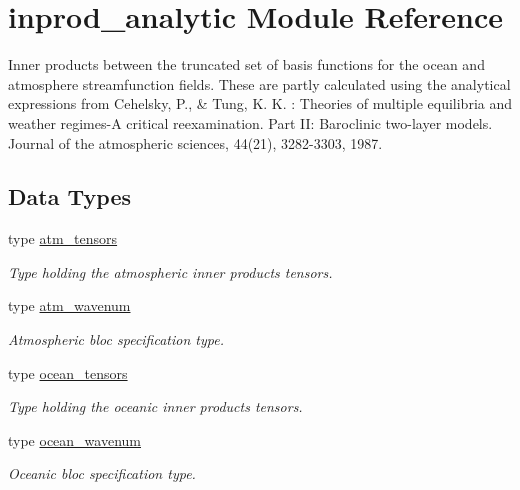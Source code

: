 \hypertarget{classinprod__analytic}{\section{inprod\-\_\-analytic Module Reference}
\label{classinprod__analytic}
}


Inner products between the truncated set of basis functions for the ocean and atmosphere streamfunction fields. These are partly calculated using the analytical expressions from Cehelsky, P., \& Tung, K. K. \-: Theories of multiple equilibria and weather regimes-\/\-A critical reexamination. Part I\-I\-: Baroclinic two-\/layer models. Journal of the atmospheric sciences, 44(21), 3282-\/3303, 1987.  


\subsection*{Data Types}
\begin{DoxyCompactItemize}
\item 
type \hyperlink{structinprod__analytic_1_1atm__tensors}{atm\-\_\-tensors}
\begin{DoxyCompactList}\small\item\em Type holding the atmospheric inner products tensors. \end{DoxyCompactList}\item 
type \hyperlink{structinprod__analytic_1_1atm__wavenum}{atm\-\_\-wavenum}
\begin{DoxyCompactList}\small\item\em Atmospheric bloc specification type. \end{DoxyCompactList}\item 
type \hyperlink{structinprod__analytic_1_1ocean__tensors}{ocean\-\_\-tensors}
\begin{DoxyCompactList}\small\item\em Type holding the oceanic inner products tensors. \end{DoxyCompactList}\item 
type \hyperlink{structinprod__analytic_1_1ocean__wavenum}{ocean\-\_\-wavenum}
\begin{DoxyCompactList}\small\item\em Oceanic bloc specification type. \end{DoxyCompactList}\end{DoxyCompactItemize}
